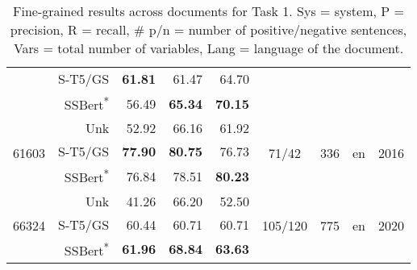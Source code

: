 \documentclass[11pt]{article}
\begin{document}
\begin{table*}[]
\begin{tabular}{l|r|r|r|r|c|c|c|c}
     &    S-T5/GS & \textbf{61.81} & 61.47 & 64.70 &       &     &         &             \\
     &    SSBert\textsuperscript{*} & 56.49 & \textbf{65.34} & \textbf{70.15} &       &     &         &             \\
    \hline
    \multirow{3}{3em}{61603} &    Unk & 52.92 & 66.16 & 61.92 &      \multirow{3}{4em}{71/42} &    \multirow{3}{1em}{336} &        \multirow{3}{1em}{en} &            \multirow{3}{2em}{2016} \\
     &    S-T5/GS & \textbf{77.90} & \textbf{80.75} & 76.73 &       &     &         &             \\
     &    SSBert\textsuperscript{*} & 76.84 & 78.51 & \textbf{80.23} &       &     &         &             \\
    \hline
    \multirow{3}{3em}{66324} &    Unk & 41.26 & 66.20 & 52.50 &      \multirow{3}{4em}{105/120} &    \multirow{3}{1em}{775} &        \multirow{3}{1em}{en} &          \multirow{3}{2em}{2020} \\
     &    S-T5/GS & 60.44 & 60.71 & 60.71 &       &     &         &             \\
     &    SSBert\textsuperscript{*} & \textbf{61.96} & \textbf{68.84} & \textbf{63.63} &       &     &         &             \\
    \hline
    \end{tabular}
    \caption{Fine-grained results across documents for Task 1. Sys = system, P = precision, R = recall, \# p/n = number of positive/negative sentences, Vars = total number of variables, Lang = language of the document.}
    \label{tab:T1-AvgDoc}
\end{table*}
\end{document}
